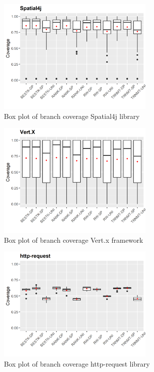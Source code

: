 \documentclass[sigconf]{acmart}
\begin{document}
\begin{figure}[h]
  \centering
  \includegraphics[width=3in]{../output/spatial4j-boxplot.png}
  \caption{Box plot of branch coverage Spatial4j library}
  \label{fig:boxplot8}
\end{figure}

\begin{figure}[h]
  \centering
  \includegraphics[width=3in]{../output/vertx-boxplot.png}
  \caption{Box plot of branch coverage Vert.x framework}
  \label{fig:boxplot9}
\end{figure}

\begin{figure}[h]
  \centering
  \includegraphics[width=3in]{../output/http-request-boxplot.png}
  \caption{Box plot of branch coverage http-request library}
  \label{fig:boxplot6}
\end{figure}

\clearpage 


\end{document}
